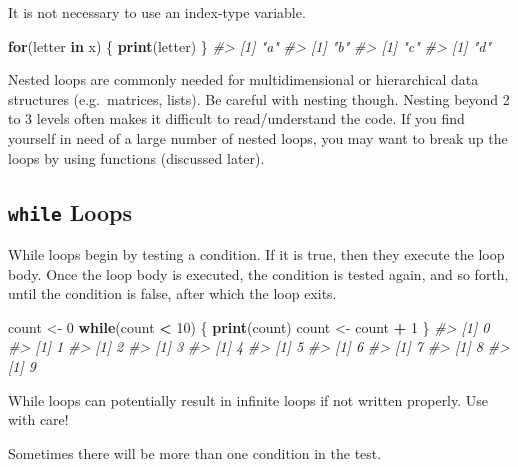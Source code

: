 \documentclass[]{book}
\newenvironment{Shaded}{\begin{snugshade}}{\end{snugshade}}
\newcommand{\KeywordTok}[1]{\textcolor[rgb]{0.13,0.29,0.53}{\textbf{#1}}}
\newcommand{\DecValTok}[1]{\textcolor[rgb]{0.00,0.00,0.81}{#1}}
\newcommand{\StringTok}[1]{\textcolor[rgb]{0.31,0.60,0.02}{#1}}
\newcommand{\CommentTok}[1]{\textcolor[rgb]{0.56,0.35,0.01}{\textit{#1}}}
\newcommand{\ControlFlowTok}[1]{\textcolor[rgb]{0.13,0.29,0.53}{\textbf{#1}}}
\newcommand{\OperatorTok}[1]{\textcolor[rgb]{0.81,0.36,0.00}{\textbf{#1}}}
\newcommand{\NormalTok}[1]{#1}
\theoremstyle{definition}
\theoremstyle{definition}
\theoremstyle{definition}
\theoremstyle{remark}
\let\BeginKnitrBlock\begin \let\EndKnitrBlock\end
\begin{document}
It is not necessary to use an index-type variable.

\begin{Shaded}
\begin{Highlighting}[]
\ControlFlowTok{for}\NormalTok{(letter }\ControlFlowTok{in}\NormalTok{ x) \{}
        \KeywordTok{print}\NormalTok{(letter)}
\NormalTok{\}}
\CommentTok{#> [1] "a"}
\CommentTok{#> [1] "b"}
\CommentTok{#> [1] "c"}
\CommentTok{#> [1] "d"}
\end{Highlighting}
\end{Shaded}

\BeginKnitrBlock{rmdtip}
Nested loops are commonly needed for multidimensional or hierarchical
data structures (e.g.~matrices, lists). Be careful with nesting though.
Nesting beyond 2 to 3 levels often makes it difficult to read/understand
the code. If you find yourself in need of a large number of nested
loops, you may want to break up the loops by using functions (discussed
later).
\EndKnitrBlock{rmdtip}

\subsection{\texorpdfstring{\texttt{while}
Loops}{while Loops}}\label{while-loops}

While loops begin by testing a condition. If it is true, then they
execute the loop body. Once the loop body is executed, the condition is
tested again, and so forth, until the condition is false, after which
the loop exits.

\begin{Shaded}
\begin{Highlighting}[]
\NormalTok{count <-}\StringTok{ }\DecValTok{0}
\ControlFlowTok{while}\NormalTok{(count }\OperatorTok{<}\StringTok{ }\DecValTok{10}\NormalTok{) \{}
        \KeywordTok{print}\NormalTok{(count)}
\NormalTok{        count <-}\StringTok{ }\NormalTok{count }\OperatorTok{+}\StringTok{ }\DecValTok{1}
\NormalTok{\}}
\CommentTok{#> [1] 0}
\CommentTok{#> [1] 1}
\CommentTok{#> [1] 2}
\CommentTok{#> [1] 3}
\CommentTok{#> [1] 4}
\CommentTok{#> [1] 5}
\CommentTok{#> [1] 6}
\CommentTok{#> [1] 7}
\CommentTok{#> [1] 8}
\CommentTok{#> [1] 9}
\end{Highlighting}
\end{Shaded}

\BeginKnitrBlock{rmdwarning}
While loops can potentially result in infinite loops if not written
properly. Use with care!
\EndKnitrBlock{rmdwarning}

Sometimes there will be more than one condition in the test.
\end{document}
